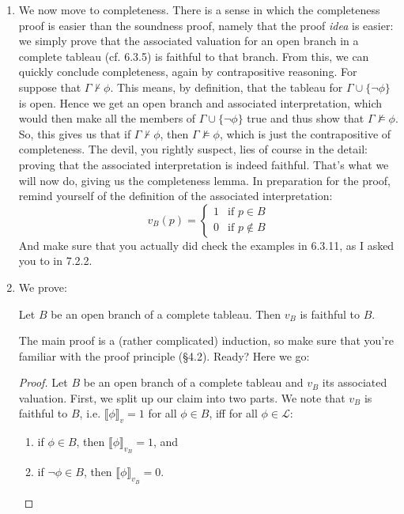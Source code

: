 \begin{enumerate}[\thesection.1]

  \item We now move to completeness.
	There is a sense in which the completeness proof is easier than the soundness proof, namely that the proof \emph{idea} is easier:
	we simply prove that the associated valuation for an open branch in a complete tableau (cf. 6.3.5) is faithful to that branch.
	From this, we can quickly conclude completeness, again by contrapositive reasoning.
	For suppose that
	$\Gamma\nvdash\phi$.
	This means, by definition, that the tableau for
	$\Gamma\cup\{\neg\phi\}$ is open.
	Hence we get an open branch and associated interpretation, which would then make all the members of
	$\Gamma\cup\{\neg\phi\}$
	true and thus show that
	$\Gamma\nvDash\phi$.
	So, this gives us that if
	$\Gamma\nvdash\phi$,
	then
	$\Gamma\nvDash\phi$, which is just the contrapositive of completeness.
	The devil, you rightly suspect, lies of course in the detail: proving that the associated interpretation is indeed faithful.
	That's what we will now do, giving us the completeness lemma.
	In preparation for the proof, remind yourself of the definition of the associated interpretation:
	\[v_B(p)=\begin{cases} 1 &\text{if }p\in B\\0&\text{if }p\notin B\end{cases}\]
	And make sure that you actually did check the examples in 6.3.11, as I asked you to in 7.2.2.
	
	\item We prove:
	\begin{lemma}
	Let $B$ be an open branch of a complete tableau. Then $v_B$ is faithful to $B$.
	\end{lemma}
	The main proof is a (rather complicated) induction, so make sure that you're familiar with the proof principle (\S4.2). Ready? Here we go:
	\begin{proof}
	Let $B$ be an open branch of a complete tableau and $v_B$ its associated valuation. First, we split up our claim into two parts. We note that $v_B$ is faithful to $B$, i.e. $\llbracket\phi\rrbracket_v=1$ for all $\phi\in B$, iff for all $\phi\in\mathcal{L}$:
	\begin{enumerate}[1.]
	
		\item if $\phi\in B$, then $\llbracket\phi\rrbracket_{v_B}=1$, and 
		\item if $\neg \phi\in B$, then $\llbracket\phi\rrbracket_{v_B}=0$.
	

\end{enumerate}
\end{proof}
\end{enumerate}
